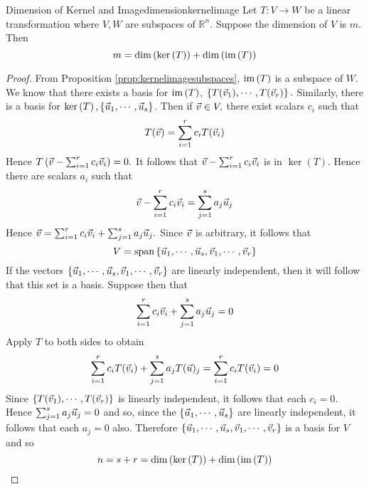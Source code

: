 \begin{theorem}{Dimension of Kernel and Image}{dimensionkernelimage}
Let $T:V\rightarrow W$ be a linear transformation where $V,W$ are subspaces of $\mathbb{R}^n$. Suppose the dimension of $V$ is $m$. Then 
\[
m=\dim \left( \ker \left( T\right) \right) +\dim \left( \mbox{im}\left(
T\right) \right) 
\]
\end{theorem}

\begin{proof}
From Proposition \ref{prop:kernelimagesubspaces}, $\mbox{im}\left( T\right) $ is a subspace of $W.$ We know that there exists a basis for $\mbox{im}\left( T\right)$, $\left\{ T(\vec{v}
_{1}),\cdots ,T(\vec{v}_{r})\right\} . $ Similarly, there is a basis for $\ker
\left( T\right) ,\left\{ \vec{u}_{1},\cdots ,\vec{u}_{s}\right\} $. Then if $
\vec{v}\in V,$ there exist scalars $c_{i}$ such that 
\begin{equation*}
T(\vec{v})=\sum_{i=1}^{r}c_{i}T(\vec{v}_{i})
\end{equation*}
Hence $T\left( \vec{v}-\sum_{i=1}^{r}c_{i}\vec{v}_{i}\right) =0.$ It follows
that $\vec{v}-\sum_{i=1}^{r}c_{i}\vec{v}_{i}$ is in $\ker \left( T\right) $.
Hence there are scalars $a_{i}$ such that 
\begin{equation*}
\vec{v}-\sum_{i=1}^{r}c_{i}\vec{v}_{i}=\sum_{j=1}^{s}a_{j}\vec{u}_{j}
\end{equation*}
Hence $\vec{v}=\sum_{i=1}^{r}c_{i}\vec{v}_{i}+\sum_{j=1}^{s}a_{j}\vec{u}
_{j}. $ Since $\vec{v}$ is arbitrary, it follows that 
\begin{equation*}
V=\mbox{span}\left\{ \vec{u}_{1},\cdots ,\vec{u}_{s},\vec{v}_{1},\cdots ,
\vec{v}_{r}\right\}
\end{equation*}
If the vectors $\left\{ \vec{u}_{1},\cdots ,\vec{u}_{s},\vec{v}_{1},\cdots ,
\vec{v}_{r}\right\} $ are linearly independent, then it will follow that
this set is a basis. Suppose then that 
\begin{equation*}
\sum_{i=1}^{r}c_{i}\vec{v}_{i}+\sum_{j=1}^{s}a_{j}\vec{u}_{j}=0
\end{equation*}
Apply $T$ to both sides to obtain 
\begin{equation*}
\sum_{i=1}^{r}c_{i}T(\vec{v}_{i})+\sum_{j=1}^{s}a_{j}T(\vec{u})
_{j}=\sum_{i=1}^{r}c_{i}T(\vec{v}_{i})=0
\end{equation*}
Since $\left\{ T(\vec{v}_{1}),\cdots ,T(\vec{v}_{r})\right\} $ is linearly
independent, it follows that each $c_{i}=0.$ Hence $\sum_{j=1}^{s}a_{j}\vec{u
}_{j}=0$ and so, since the $\left\{ \vec{u}_{1},\cdots ,\vec{u}_{s}\right\} $
are linearly independent, it follows that each $a_{j}=0$ also. Therefore $\left\{ \vec{u}_{1},\cdots ,\vec{u}_{s},\vec{v}_{1},\cdots ,\vec{v}
_{r}\right\} $ is a basis for $V$ and so 
\begin{equation*}
n=s+r=\dim \left( \ker \left( T\right) \right) +\dim \left( \mbox{im}\left(
T\right) \right) 
\end{equation*}
\end{proof}

